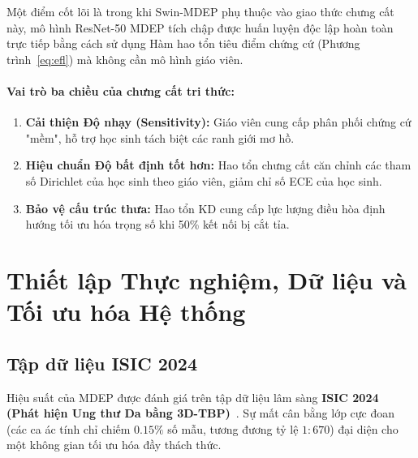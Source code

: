 \documentclass[11pt, a4paper]{article}
\begin{document}
Một điểm cốt lõi là trong khi Swin-MDEP phụ thuộc vào giao thức chưng cất này, mô hình ResNet-50 MDEP tích chập được huấn luyện độc lập hoàn toàn trực tiếp bằng cách sử dụng Hàm hao tổn tiêu điểm chứng cứ (Phương trình~\ref{eq:efl}) mà không cần mô hình giáo viên.

\paragraph{Vai trò ba chiều của chưng cất tri thức:}
\begin{enumerate}
    \item \textbf{Cải thiện Độ nhạy (Sensitivity):} Giáo viên cung cấp phân phối chứng cứ "mềm", hỗ trợ học sinh tách biệt các ranh giới mơ hồ.
    \item \textbf{Hiệu chuẩn Độ bất định tốt hơn:} Hao tổn chưng cất căn chỉnh các tham số Dirichlet của học sinh theo giáo viên, giảm chỉ số ECE của học sinh.
    \item \textbf{Bảo vệ cấu trúc thưa:} Hao tổn KD cung cấp lực lượng điều hòa định hướng tối ưu hóa trọng số khi 50\% kết nối bị cắt tỉa.
\end{enumerate}

\section{Thiết lập Thực nghiệm, Dữ liệu và Tối ưu hóa Hệ thống}\label{sec:experiment}

\subsection{Tập dữ liệu ISIC 2024}\label{subsec:isic}

Hiệu suất của MDEP được đánh giá trên tập dữ liệu lâm sàng \textbf{ISIC 2024 (Phát hiện Ung thư Da bằng 3D-TBP)}~\cite{isic2024, codella2019skin, tschandl2018ham10000}. Sự mất cân bằng lớp cực đoan (các ca ác tính chỉ chiếm $0.15\%$ số mẫu, tương đương tỷ lệ $1{:}670$) đại diện cho một không gian tối ưu hóa đầy thách thức.
\end{document}

